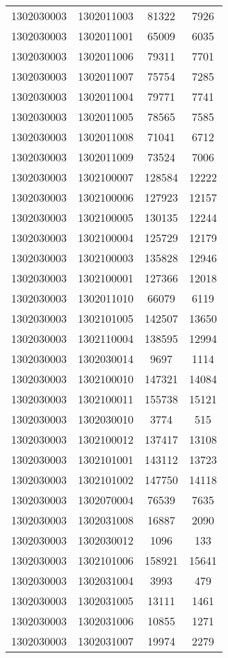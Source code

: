 \begin{longtable}{llcc}
1302030003 & 1302011003 & 81322 & 7926\\
1302030003 & 1302011001 & 65009 & 6035\\
1302030003 & 1302011006 & 79311 & 7701\\
1302030003 & 1302011007 & 75754 & 7285\\
1302030003 & 1302011004 & 79771 & 7741\\
1302030003 & 1302011005 & 78565 & 7585\\
1302030003 & 1302011008 & 71041 & 6712\\
1302030003 & 1302011009 & 73524 & 7006\\
1302030003 & 1302100007 & 128584 & 12222\\
1302030003 & 1302100006 & 127923 & 12157\\
1302030003 & 1302100005 & 130135 & 12244\\
1302030003 & 1302100004 & 125729 & 12179\\
1302030003 & 1302100003 & 135828 & 12946\\
1302030003 & 1302100001 & 127366 & 12018\\
1302030003 & 1302011010 & 66079 & 6119\\
1302030003 & 1302101005 & 142507 & 13650\\
1302030003 & 1302110004 & 138595 & 12994\\
1302030003 & 1302030014 & 9697 & 1114\\
1302030003 & 1302100010 & 147321 & 14084\\
1302030003 & 1302100011 & 155738 & 15121\\
1302030003 & 1302030010 & 3774 & 515\\
1302030003 & 1302100012 & 137417 & 13108\\
1302030003 & 1302101001 & 143112 & 13723\\
1302030003 & 1302101002 & 147750 & 14118\\
1302030003 & 1302070004 & 76539 & 7635\\
1302030003 & 1302031008 & 16887 & 2090\\
1302030003 & 1302030012 & 1096 & 133\\
1302030003 & 1302101006 & 158921 & 15641\\
1302030003 & 1302031004 & 3993 & 479\\
1302030003 & 1302031005 & 13111 & 1461\\
1302030003 & 1302031006 & 10855 & 1271\\
1302030003 & 1302031007 & 19974 & 2279\\

\end{longtable}
